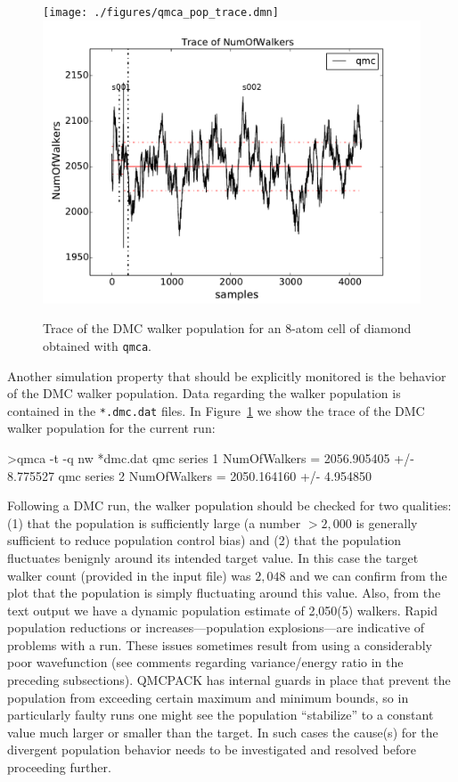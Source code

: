 \begin{figure}
\begin{center}
  \ifdefined\HCode
\texttt{[image: ./figures/qmca\_pop\_trace.dmn]}
\else
\includegraphics[trim = 0mm 0mm 0mm 0mm, clip,width=0.75\columnwidth]{./figures/qmca_pop_trace.pdf}
\fi
\end{center}
\caption{Trace of the DMC walker population for an 8-atom cell of diamond obtained with \texttt{qmca}.}
\label{fig:qmca_pop_trace}
\end{figure}

Another simulation property that should be explicitly monitored  
is the behavior of the DMC walker population.  Data regarding the 
walker population is contained in the \texttt{*.dmc.dat} files.
In Figure~\ref{fig:qmca_pop_trace} we show the trace of the DMC 
walker population for the current run:
\begin{shade}
>qmca -t -q nw *dmc.dat
qmc  series 1  NumOfWalkers          =  2056.905405 +/- 8.775527 
qmc  series 2  NumOfWalkers          =  2050.164160 +/- 4.954850 
\end{shade}
\noindent
Following a DMC run, the walker population should be checked for 
two qualities: (1) that the population is sufficiently large (a number 
$>2,000$ is generally sufficient to reduce population control bias) and  
(2) that the population fluctuates benignly around its intended target 
value. In this case the target walker count (provided in the input file)
was $2,048$ and we can confirm from the plot that the population is simply 
fluctuating around this value.  Also, from the text output we have a dynamic 
population estimate of 2,050(5) walkers.  Rapid population reductions or 
increases---population explosions---are indicative of problems with a run.  
These issues sometimes result from using a considerably poor wavefunction 
(see comments regarding variance/energy ratio in the preceding 
subsections).  QMCPACK has internal guards in place that prevent 
the population from exceeding certain maximum and minimum bounds, so 
in particularly faulty runs one might see the population ``stabilize'' 
to a constant value much larger or smaller than the target.  In such 
cases the cause(s) for the divergent population behavior needs to 
be investigated and resolved before proceeding further.




